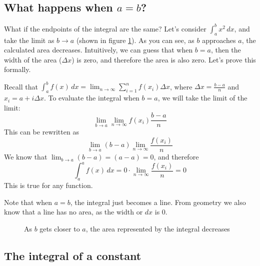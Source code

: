 \subsection{What happens when $a=b$?}

What if the endpoints of the integral are the same? Let's consider 
$\int_a^b x^2\,dx$, and take the limit as $b \to a$ (shown in figure 
\ref{fig:aequalb}). As you can see, as $b$ approaches $a$, the 
calculated area decreases. Intuitively, we can guess that when $b=a$, 
then the width of the area ($\Delta x$) is zero, and therefore the 
area is also zero. Let's prove this formally. 

Recall that $\int_a^b f(x)\,dx = \lim_{n\to \infty} \sum_{i = 1}^{n}
f(x_i)\Delta x$, where $\Delta x = \frac{b - a}{n}$ and $x_i = a + i
\Delta x$. To evaluate the integral when $b = a$, we will take the 
limit of the limit: $$\lim_{b \to a} \lim_{n \to \infty}f(x_i)
\frac{b - a}{n}$$ This can be rewritten as $$\lim_{b \to a} (b - a) 
\lim_{n \to \infty}\frac{f(x_i)}{n}$$ We know that $\lim_{b \to a}
(b - a) = (a - a) = 0$, and therefore $$\int_a^a f(x)\,dx = 0 \cdot 
\lim_{n \to \infty}\frac{f(x_i)}{n} = 0$$ This is true for any 
function. 

Note that when $a=b$, the integral just becomes a line. From geometry we also know that 
a line has no area, as the width or $dx$ is 0. 

\begin{figure}[htbp]
    \centering
    \caption{As $b$ gets closer to $a$, the area represented by the 
    integral decreases}
    \label{fig:aequalb}
\end{figure}

\subsection{The integral of a constant}

